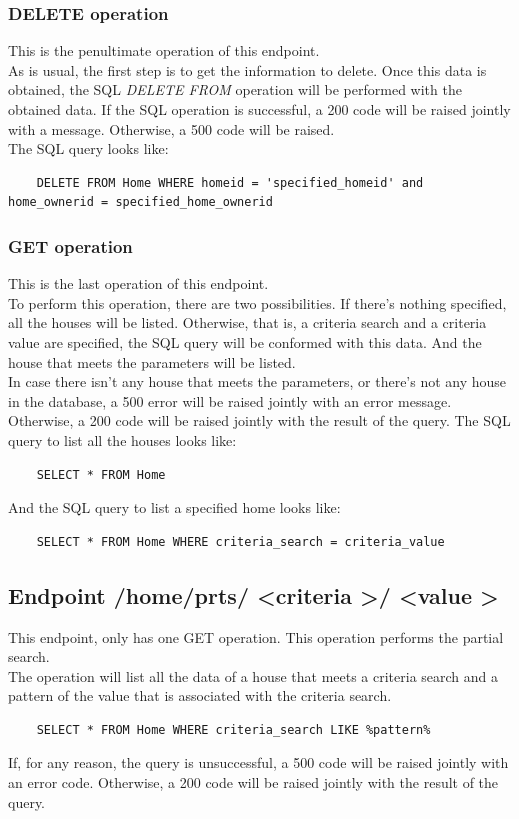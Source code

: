 \documentclass[a4paper,12pt]{article}
\begin{document}
\subsubsection*{DELETE operation}
This is the penultimate operation of this endpoint.\\
As is usual, the first step is to get the information to delete. Once this data is obtained, the SQL \textit{DELETE FROM} operation will be performed with the obtained data. If the SQL operation is successful, a 200 code will be raised jointly with a message. Otherwise, a 500 code will be raised.\\
The SQL query looks like:
\begin{lstlisting}
    DELETE FROM Home WHERE homeid = 'specified_homeid' and home_ownerid = specified_home_ownerid
\end{lstlisting}
\subsubsection*{GET operation}
This is the last operation of this endpoint.\\
To perform this operation, there are two possibilities. If there's nothing specified, all the houses will be listed.
Otherwise, that is, a criteria search and a criteria value are specified, the SQL query will be conformed with this data. And the house that meets the parameters will be listed.\\
In case there isn't any house that meets the parameters, or there's not any house in the database, a 500 error will be raised jointly with an error message. Otherwise, a 200 code will be raised jointly with the result of the query.
The SQL query to list all the houses looks like:
\begin{lstlisting}
    SELECT * FROM Home
\end{lstlisting}
And the SQL query to list a specified home looks like:
\begin{lstlisting}
    SELECT * FROM Home WHERE criteria_search = criteria_value
\end{lstlisting}
\subsection*{Endpoint /home/prts/ \textless criteria \textgreater / \textless value \textgreater}
This endpoint, only has one GET operation. This operation performs the partial search.\\
The operation will list all the data of a house that meets a criteria search and a pattern of the value that is associated with the criteria search.
\begin{lstlisting}
    SELECT * FROM Home WHERE criteria_search LIKE %pattern%
\end{lstlisting}
If, for any reason, the query is unsuccessful, a 500 code will be raised jointly with an error code. Otherwise, a 200 code will be raised jointly with the result of the query.
\end{document}
